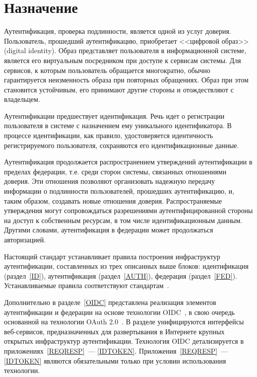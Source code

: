 \section{Назначение}\label{COMMON.Purpose}

Аутентификация, проверка подлинности, является одной из услуг доверия. 
%
Пользователь, прошедший аутентификацию, приобретает <<цифровой образ>> 
(digital identity). Образ представляет пользователя в информационной системе, 
является его виртуальным посредником при доступе к сервисам системы.
%
Для сервисов, к которым пользователь обращается многократно, обычно 
гарантируется неизменность образа при повторных обращениях. 
%
Образ при этом становится устойчивым, его принимают другие стороны 
и отождествляют с владельцем.

Аутентификации предшествует идентификация. Речь идет о регистрации пользователя
в системе с назначением ему уникального идентификатора. В процессе
идентификации, как правило, удостоверяется идентичность регистрируемого
пользователя, сохраняются его идентификационные данные.

Аутентификация продолжается распространением утверждений аутентификации в
пределах федерации, т.е. среди сторон системы, связанных отношениями 
доверия.
%
Эти отношения позволяют организовать надежную передачу информации о подлинности 
пользователей, прошедших аутентификацию, и, таким образом, создавать новые отношения 
доверия.
%
Распространяемые утверждения могут сопровождаться разрешениями
аутентифицированной стороны на доступ к собственным ресурсам, в том числе
идентификационным данным. Другими словами, аутентификация в федерации может
продолжаться авторизацией.


Настоящий стандарт устанавливает правила построения инфраструктур 
аутентификации, составленных из трех описанных выше блоков: 
идентификация (раздел~\ref{ID}), аутентификация (раздел~\ref{AUTH}), 
федерация (раздел~\ref{FED}).
%           
Устанавливаемые правила соответствуют 
стандартам~\cite{SP800-63-3,SP800-63-3A,SP800-63-3B,SP800-63-3C,ISO29115}. 

Дополнительно в разделе~\ref{OIDC} представлена реализация элементов 
аутентификации и федерации на основе технологии OIDC~\cite{OIDC}, в свою 
очередь основанной на технологии OAuth 2.0~\cite{RFC6749}. В разделе 
унифицируются интерфейсы веб-сервисов, предназначенных для развертывания
в Интернете крупных открытых инфраструктур аутентификации.
%
Технология OIDC детализируется в приложениях~\ref{REQRESP}~--- \ref{IDTOKEN}. 
%
Приложения~\ref{REQRESP}~--- \ref{IDTOKEN} являются обязательными только при 
условии использования технологии.


